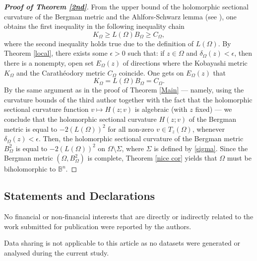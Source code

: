 \documentclass[12pt] {article}
\numberwithin{equation}{section}
\begin{document}
 
  \begin{proof} [{\bf Proof of Theorem \ref{2nd}}]
  


 



 
 

From the upper bound of the holomorphic sectional curvature of the Bergman metric and the Ahlfors-Schwarz lemma (see \cite{Ahlfors, Roy, Yau78}), one obtains the first inequality in the following inequality chain
$$
K_{\Omega} \geq L(\Omega) B_\Omega  \geq C_\Omega,
$$
where the second inequality holds true due to the definition of $L(\Omega)$. 
By Theorem \ref{local}, there exists some $\epsilon > 0$ such that: if $z \in \Omega$ and $\delta_\Omega(z) < \epsilon$, then there is a nonempty, open set $E_\Omega(z)$ of directions where the Kobayashi metric $K_{\Omega}$ and the Carath\'eodory metric $C_{\Omega}$ coincide. One gets  on $E_\Omega(z)$ that  
$$
K_{\Omega} = L(\Omega)  B_\Omega = C_\Omega.
$$
By the same argument as in the proof of Theorem \ref{Main} --- namely, using the curvature bounds of the third author \cite{W} together with the fact that the holomorphic sectional curvature function $v \mapsto H(z; v)$ is algebraic (with $z$ fixed) --- we conclude that the holomorphic sectional curvature $H(z; v)$ of the Bergman metric is equal to $-2(L(\Omega))^2$ for all non-zero $v \in T_z(\Omega)$, whenever $\delta_\Omega(z) < \epsilon$.
Then, the holomorphic sectional curvature of the Bergman metric $B^2_\Omega$ is equal to $-2(L(\Omega))^2$ on $\Omega \setminus \Sigma$, where $\Sigma$ is defined by \eqref{sigma}. 
Since the Bergman metric $(\Omega, B^{2}_{\Omega})$ is complete,
Theorem \ref{nice cor} yields that $\Omega$ must be biholomorphic to $\mathbb{B}^n$.



 
 
  \end{proof}
 
  
 

    \medskip
      
 \subsection*{Statements and Declarations}

No financial or non-financial interests that are directly or indirectly related to the work submitted for publication were reported by the authors.

Data sharing is not applicable to this article as no datasets were generated or analysed during the current study.
\end{document}
